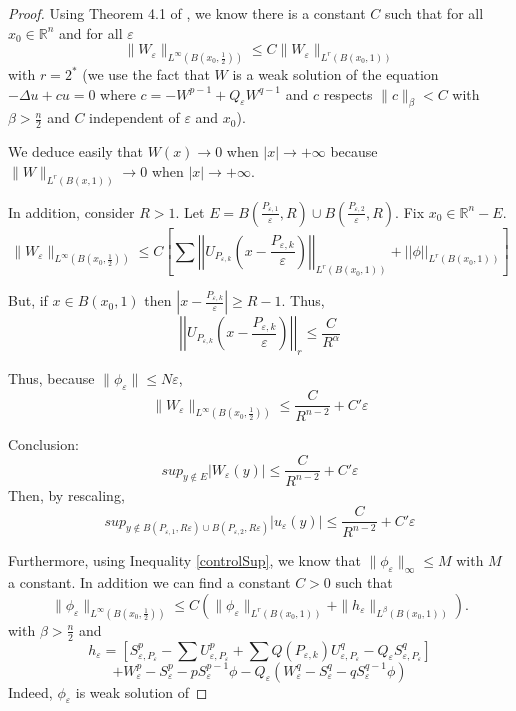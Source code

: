 \documentclass[12pt]{amsart}
\theoremstyle{plain}
\theoremstyle{definition}
\theoremstyle{remark}
\renewcommand{\epsilon}{\varepsilon}
\begin{document}
\begin{proof}
Using Theorem 4.1 of \cite{HanLin2011}, we know there is a constant $C$ such that for all $x_0 \in \mathbb{R}^n$ and for all $\epsilon$
\begin{equation}\label{controlSup}\tag{$10$}
    \|W_{\epsilon}\|_{L^\infty(B(x_0,\frac{1}{2}))} \leq C\|W_\epsilon\|_{L^r(B(x_0,1))}
\end{equation}
with $r=2^*$ (we use the fact that $W$ is a weak solution of the equation $-\Delta u+cu=0$ where $c=-W^{p-1}+Q_\epsilon W^{q-1}$ and $c$ respects $\|c\|_\beta<C$ with $\beta >\frac{n}{2}$ and $C$ independent of $\epsilon$ and $x_0$).

We deduce easily that $W(x)\rightarrow0$ when $|x|\rightarrow +\infty$ because $\|W\|_{L^r(B(x,1))}\rightarrow0  $ when $|x|\rightarrow +\infty$.

In addition, consider $R>1$. Let $E=B(\frac{P_{\epsilon,1}}{\epsilon},R)\cup B(\frac{P_{\epsilon,2}}{\epsilon},R)$. Fix $x_0 \in \mathbb{R}^n-E$. 
$$\|W_{\epsilon}\|_{L^\infty(B(x_0,\frac{1}{2}))} \leq C\left[\sum \left|\left|U_{P_{\epsilon,k}}\left(x-\frac{P_{\epsilon,k}}{\epsilon}\right)\right|\right|_{L^r(B(x_0,1))}+\left|\left|\phi\right|\right|_{L^r(B(x_0,1))}\right]$$

But, if $x\in B(x_0,1)$ then $|x-\frac{P_{\epsilon,k}}{\epsilon}|\geq R-1$. Thus, 
$$\left|\left|U_{P_{\epsilon,k}}\left(x-\frac{P_{\epsilon,k}}{\epsilon}\right)\right|\right|_r \leq \frac{C}{R^\alpha}$$




Thus, because $\|\phi_{\epsilon}\|\leq N\epsilon$,
$$\|W_{\epsilon}\|_{L^\infty(B(x_0,\frac{1}{2}))}\leq \frac{C}{R^{n-2}}+C'\epsilon $$


Conclusion:
$$sup_{y \notin E}|W_{\epsilon}(y)|\leq \frac{C}{R^{n-2}}+C'\epsilon $$
Then, by rescaling, 
$$sup_{y \notin B(P_{\epsilon,1},R\epsilon)\cup B(P_{\epsilon,2},R\epsilon)}|u_{\epsilon}(y)|\leq \frac{C}{R^{n-2}}+C'\epsilon $$

Furthermore, using Inequality \ref{controlSup}, we know that $\|\phi_\epsilon\|_\infty\leq M$ with $M$ a constant. In addition  we can find a constant $C>0$ such that  $$\|\phi_\epsilon\|_{L^\infty(B(x_0,\frac{1}{2}))}\leq C(\| \phi_{\epsilon}\|_{L^r(B(x_0,1))}+\|h_\epsilon\|_{L^\beta(B(x_0,1))}).$$
with $\beta >\frac{n}{2}$ and 
$$h_\epsilon=\left[S_{\epsilon,P_\epsilon}^p-\sum U_{\epsilon,P_\epsilon}^p+\sum Q(P_{\epsilon,k})U_{\epsilon,P_\epsilon}^q-Q_\epsilon S_{\epsilon,P_\epsilon}^q\right]$$$$+W_{\epsilon}^p-S_{\epsilon}^p-pS_\epsilon^{p-1}\phi-Q_{\epsilon}(W_{\epsilon}^q-S_{\epsilon}^q-qS_\epsilon^{q-1}\phi)$$
Indeed,  $\phi_{\epsilon}$ is weak solution of 



\end{proof}
\end{document}
